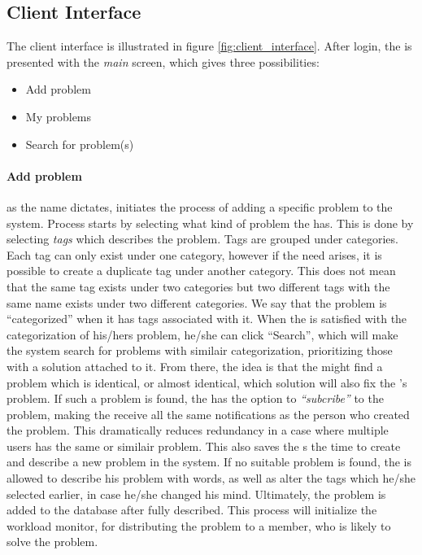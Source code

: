 \subsection{Client Interface}
\label{sec:client_interface}

The client interface is illustrated in figure \ref{fig:client_interface}.
After login, the \aclient[] is presented with the \textit{main} screen, which gives three possibilities:
\begin{itemize}
	\item Add problem
	\item My problems
	\item Search for problem(s)
\end{itemize}

\paragraph{Add problem}as the name dictates, initiates the process of adding a specific problem to the system. Process starts by selecting what kind of problem the \aclient[] has. This is done by selecting \textit{tags} which describes the problem. Tags are grouped under categories. Each tag can only exist under one category, however if the need arises, it is possible to create a duplicate tag under another category. This does not mean that the same tag exists under two categories but two different tags with the same name exists under two different categories. We say that the problem is ``categorized'' when it has tags associated with it.
When the \aclient[] is satisfied with the categorization of his/hers problem, he/she can click ``Search'', which will make the system search for problems with similair categorization, prioritizing those with a solution attached to it.
From there, the idea is that the \aclient[] might find a problem which is identical, or almost identical, which solution will also fix the \aclient 's problem. If such a problem is found, the \aclient[] has the option to \textit{``subcribe''} to the problem, making the \aclient[] receive all the same notifications as the person who created the problem. This dramatically reduces redundancy in a case where multiple users has the same or similair problem. This also saves the \aclient s the time to create and describe a new problem in the system.
If no suitable problem is found, the \aclient[] is allowed to describe his problem with words, as well as alter the tags which he/she selected earlier, in case he/she changed his mind. Ultimately, the problem is added to the database after fully described. This process will initialize the workload monitor, for distributing the problem to a \astaff[] member, who is likely to solve the problem.
